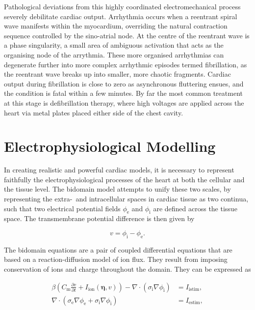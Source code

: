     Pathological deviations from this highly coordinated electromechanical process severely debilitate cardiac output. Arrhythmia occurs when a reentrant spiral wave manifests within the myocardium, overriding the natural contraction sequence controlled by the sino-atrial node. At the centre of the reentrant wave is a phase singularity, a small area of ambiguous activation that acts as the organising node of the arrythmia. These more organised arrhythmias can degenerate further into more complex arrhythmic episodes termed fibrillation, as the reentrant wave breaks up into smaller, more chaotic fragments. Cardiac output during fibrillation is close to zero as asynchronous fluttering ensues, and the condition is fatal within a few minutes. By far the most common treatment at this stage is defibrillation therapy, where high voltages are applied across the heart via metal plates placed either side of the chest cavity.

\section{Electrophysiological Modelling}
\label{sec:electrophysiological_modelling}
  In creating realistic and powerful cardiac models, it is necessary to represent faithfully the electrophysiological processes of the heart at both the cellular and the tissue level. The bidomain model attempts to unify these two scales, by representing the extra-~and intracellular spaces in cardiac tissue as two continua, such that two electrical potential fields $\phi_\text{e}$ and $\phi_\text{i}$ are defined across the tissue space. The transmembrane potential difference is then given by
  
  \begin{equation}
    v = \phi_\text{i} - \phi_\text{e}.
  \end{equation}
  
  The bidomain equations are a pair of coupled differential equations that are based on a reaction-diffusion model of ion flux. They result from imposing conservation of ions and charge throughout the domain. They can be expressed as
  
  \begin{align}
    \beta \left( C_\text{m}\frac{\partial v}{\partial t} + I_\text{ion}\left( \boldsymbol\eta, v \right) \right) - \nabla \cdot \left( \sigma_\text{i} \nabla \phi_\text{i} \right) &= I_\text{istim}, \\
      \nabla \cdot \left( \sigma_\text{e} \nabla \phi_\text{e} +  \sigma_\text{i} \nabla \phi_\text{i} \right) &= I_\text{estim},
  \end{align} 
  
